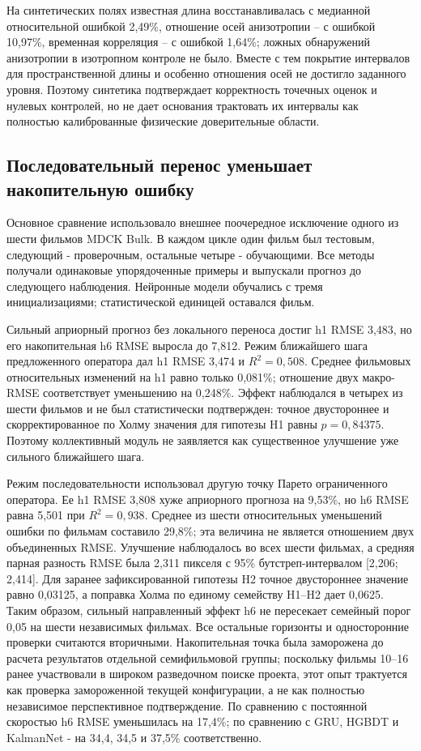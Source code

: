 \documentclass[11pt,a4paper]{article}
\begin{document}
На синтетических полях известная длина восстанавливалась с медианной относительной ошибкой 2,49\%, отношение осей анизотропии -- с ошибкой 10,97\%, временная корреляция -- с ошибкой 1,64\%; ложных обнаружений анизотропии в изотропном контроле не было. Вместе с тем покрытие интервалов для пространственной длины и особенно отношения осей не достигло заданного уровня. Поэтому синтетика подтверждает корректность точечных оценок и нулевых контролей, но не дает основания трактовать их интервалы как полностью калиброванные физические доверительные области.

\subsection{Последовательный перенос уменьшает накопительную ошибку}
Основное сравнение использовало внешнее поочередное исключение одного из шести фильмов MDCK Bulk. В каждом цикле один фильм был тестовым, следующий - проверочным, остальные четыре - обучающими. Все методы получали одинаковые упорядоченные примеры и выпускали прогноз до следующего наблюдения. Нейронные модели обучались с тремя инициализациями; статистической единицей оставался фильм.

Сильный априорный прогноз без локального переноса достиг h1 RMSE 3,483, но его накопительная h6 RMSE выросла до 7,812. Режим ближайшего шага предложенного оператора дал h1 RMSE 3,474 и $R^2=0{,}508$. Среднее фильмовых относительных изменений на h1 равно только 0,081\%; отношение двух макро-RMSE соответствует уменьшению на 0,248\%. Эффект наблюдался в четырех из шести фильмов и не был статистически подтвержден: точное двустороннее и скорректированное по Холму значения для гипотезы H1 равны $p=0{,}84375$. Поэтому коллективный модуль не заявляется как существенное улучшение уже сильного ближайшего шага.

Режим последовательности использовал другую точку Парето ограниченного оператора. Ее h1 RMSE 3,808 хуже априорного прогноза на 9,53\%, но h6 RMSE равна 5,501 при $R^2=0{,}938$. Среднее из шести относительных уменьшений ошибки по фильмам составило 29,8\%; эта величина не является отношением двух объединенных RMSE. Улучшение наблюдалось во всех шести фильмах, а средняя парная разность RMSE была 2,311 пикселя с 95\% бутстреп-интервалом [2,206; 2,414]. Для заранее зафиксированной гипотезы H2 точное двустороннее значение равно 0,03125, а поправка Холма по единому семейству H1--H2 дает 0,0625. Таким образом, сильный направленный эффект h6 не пересекает семейный порог 0,05 на шести независимых фильмах. Все остальные горизонты и односторонние проверки считаются вторичными. Накопительная точка была заморожена до расчета результатов отдельной семифильмовой группы; поскольку фильмы 10--16 ранее участвовали в широком разведочном поиске проекта, этот опыт трактуется как проверка замороженной текущей конфигурации, а не как полностью независимое перспективное подтверждение. По сравнению с постоянной скоростью h6 RMSE уменьшилась на 17,4\%; по сравнению с GRU, HGBDT и KalmanNet - на 34,4, 34,5 и 37,5\% соответственно.
\end{document}
